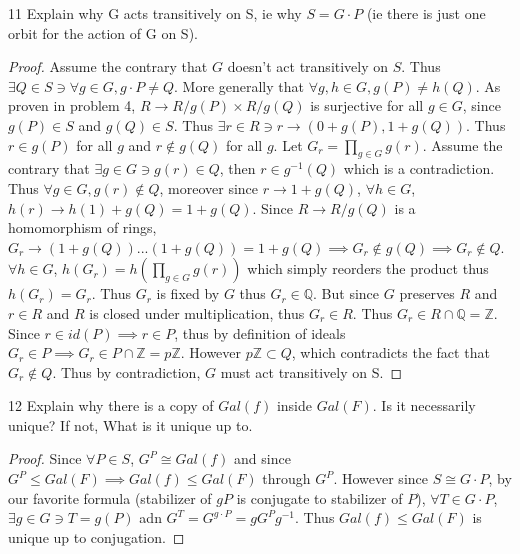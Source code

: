 \documentclass{article}
\newcommand{\Q}{\mathbb{Q}}
\newcommand{\Z}{\mathbb{Z}}
\begin{document}
\bigskip

\begin{PROB}{11}\label{Problem 11.}
    Explain why G acts transitively on S, ie why $S = G \cdot  P$ (ie there is just one orbit for the action of G on S).
\end{PROB}
\begin{proof}
    Assume the contrary that $G$ doesn't act transitively on $S$. Thus $\exists Q \in S \ni \forall g \in G, g \cdot P \neq Q$. More generally that $\forall g, h \in G, g(P) \neq h(Q)$. As proven in problem 4, $R \to R / g(P) \times R / g(Q)$ is surjective for all $g \in G$, since $g(P) \in S$ and $g(Q) \in S$. Thus $\exists r \in R \ni r \to (0 + g(P), 1 + g(Q))$. Thus $r \in g(P)$ for all $g$ and $r \not \in g(Q)$ for all $g$. Let $G_r = \prod_{g \in G} g(r)$. Assume the contrary that $\exists g \in G \ni g(r) \in Q$, then $r \in g^{-1}(Q)$ which is a contradiction. Thus $\forall g \in G, g(r) \not \in Q$, moreover since $r \to 1 + g(Q)$, $\forall h \in G$, $h(r) \to h(1) + g(Q) = 1 + g(Q)$. Since $R \to R / g(Q)$ is a homomorphism of rings, $G_r \to (1 + g(Q)) ... (1 + g(Q)) = 1 + g(Q) \implies G_r \not \in g(Q) \implies G_r \not \in Q$.$\forall h \in G$, $h(G_r) = h(\prod_{g \in G} g(r))$ which simply reorders the product thus $h(G_r) = G_r$. Thus $G_r$ is fixed by $G$ thus $G_r \in \Q$. But since $G$ preserves $R$ and $r \in R$ and $R$ is closed under multiplication, thus $G_r \in R$. Thus $G_r \in R \cap \Q = \Z$. Since $r \in id(P) \implies r \in P$, thus by definition of ideals $G_r \in P \implies G_r \in P \cap \Z = p\Z$. However $p\Z \subset Q$, which contradicts the fact that $G_r \not \in Q$. Thus by contradiction, $G$ must act transitively on S.             
\end{proof}

\bigskip

\begin{PROB}{12}\label{Problem 12.}
    Explain why there is a copy of $Gal(f)$ inside $Gal(F)$.  Is it necessarily unique?  If not, What is it unique up to.
\end{PROB}
\begin{proof}
    Since $\forall P \in S$, $G^P \cong Gal(f)$ and since $G^P \leq Gal(F) \implies Gal(f) \leq Gal(F)$ through $G^P$. However since $S \cong G \cdot P$, by our favorite formula (stabilizer of $gP$ is conjugate to stabilizer of $P$), $\forall T \in G \cdot P$, $\exists g \in G \ni T = g(P)$ adn $G^T = G^{g \cdot P} = g G^P g^{-1}$. Thus $Gal(f) \leq Gal(F)$ is unique up to conjugation.          
\end{proof}
\end{document}
